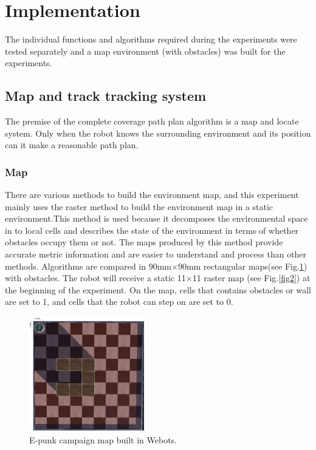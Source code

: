 \documentclass[conference]{IEEEtran}
\begin{document}
\section{Implementation}
The individual functions and algorithms required during the experiments were tested separately and a map environment (with obstacles) was built for the experiments.


\subsection{Map and track tracking system}

The premise of the complete coverage path plan algorithm is a map and locate system. Only when the robot knows the surrounding environment and its position can it make a reasonable path plan.

\subsubsection{Map}

There are various methods to build the environment map, and this experiment mainly uses the raster method\cite{hart1968formal} to build the environment map in a static environment.This method is used because it decomposes the environmental space in to local cells and describes the state of the environment in terms of whether obstacles occupy them or not. The maps produced by this method provide accurate metric information and are easier to understand and process than other methods. Algorithms are compared in 90mm×90mm rectangular maps(see Fig.\ref{fig1}) with obstacles. The robot will receive a static 11×11 raster map (see Fig.\ref{fig2}) at the beginning of the experiment. On the map, cells that contains obstacles or wall are set to 1, and cells that the robot can step on are set to 0.

\begin{figure}[htbp]
\centerline{\includegraphics[width=5cm,height=5cm]{RS_Report/Webots_map.png}}
\caption{E-punk campaign map built in Webots.}
\label{fig1}
\end{figure}
\end{document}
